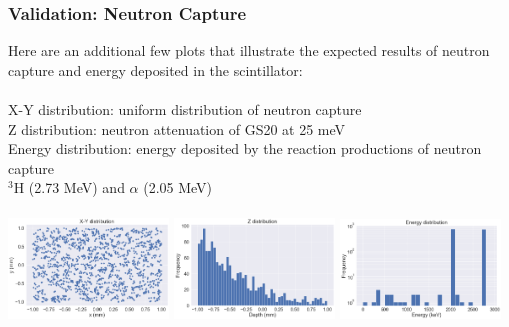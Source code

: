\documentclass[xcolor=x11names, compress, handout]{beamer}
\renewcommand{\(}{\begin{columns}}
\renewcommand{\)}{\end{columns}}
\newcommand{\<}[1]{\begin{column}{#1}}
\renewcommand{\>}{\end{column}}
\begin{document}
\begin{frame}
  \frametitle{Validation: Neutron Capture}
  \scriptsize
  Here are an additional few plots that illustrate the expected results of neutron capture and energy deposited in the scintillator: \\
  \ \\
  \centering
  X-Y distribution: uniform distribution of neutron capture \\
  Z distribution: neutron attenuation of GS20 at 25 meV  \\
  Energy distribution: energy deposited by the reaction productions of neutron capture \\
   $^3$H (2.73 MeV) and $\alpha$ (2.05 MeV) \\
  \ \\
  
  \includegraphics[width=0.32\textwidth, height=0.45\textheight]{images/xy_distribution1.png}
  \includegraphics[width=0.32\textwidth, height=0.45\textheight]{images/z_distribution1.png}
  \includegraphics[width=0.32\textwidth, height=0.45\textheight]{images/energy_distribution1.png}
\end{frame}
\end{document}
